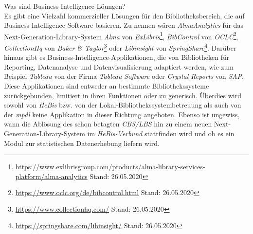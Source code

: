 Was sind Business-Intelligence-Löungen?\\
Es gibt eine Vielzahl kommerzieller Lösungen für den Bibliotheksbereich, die auf Business-Intelligence-Software basieren.
Zu nennen wären \textit{AlmaAnalytics} für das Next-Generation-Library-System \textit{Alma} von \textit{ExLibris}\footnote{\url{https://www.exlibrisgroup.com/products/alma-library-services-platform/alma-analytics}
Stand: 26.05.2020}, \textit{BibControl} von \textit{OCLC}\footnote{\url{https://www.oclc.org/de/bibcontrol.html} Stand: 26.05.2020},
\textit{CollectionHq} von \textit{Baker \& Taylor}\footnote{\url{https://www.collectionhq.com/} Stand: 26.05.2020} oder \textit{Libinsight} von \textit{SpringShare}\footnote{\url{https://springshare.com/libinsight/} Stand: 26.05.2020}.
Darüber hinaus gibt es Business-Intelligence-Applikationen, die von
Bibliotheken für Reporting, Datenanalyse und Datenvisualisierung adaptiert werden,
wie zum Beispiel \textit{Tableau} von der Firma \textit{Tableau Software} oder
\textit{Crystal Reports} von \textit{SAP}.
Diese Applikationen sind entweder
an bestimmte Bibliothekssysteme zurückgebunden, limitiert in ihren
Funktionen\cite{golas_statistische_2018} oder zu generisch.
Überdies wird sowohl von \textit{HeBis} bzw. von der
Lokal-Bibliothekssystembetreuung als auch von der \textit{mpdl} keine Applikation
in dieser Richtung angeboten.
Ebenso ist ungewiss, wann die Ablösung des schon betagten \textit{CBS/LBS} hin zu
einem neuen Next-Generation-Library-System im \textit{HeBis-Verbund} stattfinden wird und ob
es ein Modul zur statistischen Datenerhebung liefern wird.
